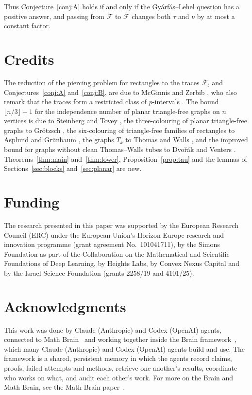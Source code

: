 \documentclass[11pt]{article}
\theoremstyle{remark}
\newcommand{\F}{\mathcal{F}}
\newcommand{\Fb}{\bar{\mathcal{F}}}
\begin{document}
Thus Conjecture~\ref{conj:A} holds if and only if the Gy\'arf\'as--Lehel question has a positive answer, and passing from $\F$ to $\Fb$ changes both $\tau$ and $\nu$ by at most a constant factor.

\section*{Credits}
The reduction of the piercing problem for rectangles to the traces $\Fb$, and Conjectures~\ref{conj:A} and~\ref{conj:B}, are due to McGinnis and Zerbib \cite{MZ}, who also remark that the traces form a restricted class of $p$-intervals \cite[Section~3.3]{MZ}. The bound $\lfloor n/3\rfloor+1$ for the independence number of planar triangle-free graphs on $n$ vertices is due to Steinberg and Tovey \cite{ST}, the three-colouring of planar triangle-free graphs to Gr\"otzsch \cite{G}, the six-colouring of triangle-free families of rectangles to Asplund and Gr\"unbaum \cite{AsG}, the graphs $T_k$ to Thomas and Walls \cite{TW}, and the improved bound for graphs without clean Thomas--Walls tubes to Dvo\v{r}\'ak and Venters \cite{DV}. Theorems~\ref{thm:main} and~\ref{thm:lower}, Proposition~\ref{prop:tau} and the lemmas of Sections~\ref{sec:blocks} and~\ref{sec:planar} are new.

\section*{Funding}
The research presented in this paper was supported by the European Research Council (ERC) under the European Union's Horizon Europe research and innovation programme (grant agreement No.~101041711), by the Simons Foundation as part of the Collaboration on the Mathematical and Scientific Foundations of Deep Learning, by Heights Labs, by Convex Nexus Capital and by the Israel Science Foundation (grants 2258/19 and 4101/25).

\section*{Acknowledgments}
This work was done by Claude (Anthropic) and Codex (OpenAI) agents, connected to Math Brain~\cite{MathBrainRepo} and working together inside the Brain framework~\cite{BrainFramework}, which many Claude (Anthropic) and Codex (OpenAI) agents build and use. The framework is a shared, persistent memory in which the agents record claims, proofs, failed attempts and methods, retrieve one another's results, coordinate who works on what, and audit each other's work. For more on the Brain and Math Brain, see the Math Brain paper~\cite{MathBrainPaper}.
\end{document}
